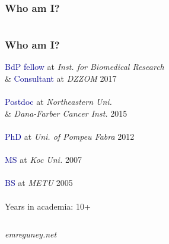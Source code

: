 \documentclass[12pt, pdf, table]{beamer}  %
\begin{document}
\frame
{
    \frametitle{Who am I?}
    \begin{columns}
    \begin{column}{0.3\textwidth}
    \begin{figure}
    \texttt{[image: \\convertpath\{emre\_map.png]}}
    \end{figure}
    \end{column}
    \begin{column}{0.7\textwidth}
    \frametitle{Who am I?}
    \hfill \textcolor{darkblue}{BdP fellow} at \textit{Inst. for Biomedical Research} \\ %
    \hfill \& \textcolor{darkblue}{Consultant} at \textit{DZZOM} \textcolor{redik}{2017} \\
    \hfill \hrulefill \\
    \hfill \textcolor{darkblue}{Postdoc} at \textit{Northeastern Uni.} \\ %
    \hfill \& \textit{Dana-Farber Cancer Inst.} \textcolor{redik}{2015} \\
    \hfill \hrulefill \\
    \hfill \textcolor{darkblue}{PhD} at \textit{Uni. of Pompeu Fabra} \textcolor{redik}{2012} \\ %
    \hfill \hrulefill \\
    \hfill \textcolor{darkblue}{MS} at \textit{Koc Uni.} \textcolor{redik}{2007} \\ %
    \hfill \hrulefill \\
    \hfill \textcolor{darkblue}{BS} at \textit{METU} \textcolor{redik}{2005} \\ %
    \hfill \hrulefill \\
    \hfill Years in academia: \textcolor{redik}{10+} \\
    \end{column}
    \end{columns}
    \bigskip
    \bigskip
    \hfill \textcolor{darkgreen!70}{\it emreguney.net} %
    \pause
}
\end{document}
